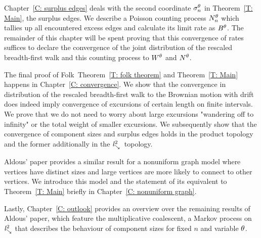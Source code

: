 Chapter~\ref{C: surplus edges} deals with the second coordinate $\mathcal{\sigma}^{\theta}_n$ in Theorem~\ref{T: Main}, the surplus edges.
We describe a Poisson counting process $N_n^{\theta}$ which tallies up all encountered excess edges and calculate its limit rate as $B^{\theta}$.
The remainder of this chapter will be spent proving that this convergence of rates suffices to declare the convergence of the joint distribution of
the rescaled breadth-first walk and this counting process to $W^{\theta}$ and $N^{\theta}$.

The final proof of Folk~Theorem~\ref{T: folk theorem} and Theorem~\ref{T: Main} happens in Chapter~\ref{C: convergence}.
We show that the convergence in distribution of the rescaled breadth-first walk to the Brownian motion with drift
does indeed imply convergence of excursions of certain length on finite intervals.
We prove that we do not need to worry about large excursions "wandering off to infinity" or the total weight of smaller excursions.
We subsequently show that the convergence of component sizes and surplus edges holds in the product topology 
and the former additionally in the $\mathit{l}^2_{\searrow}$~topology.

Aldous' paper provides a similar result for a nonuniform graph model where vertices have distinct sizes
and large vertices are more likely to connect to other vertices.
We introduce this model and the statement of its equivalent to Theorem~\ref{T: Main} briefly in Chapter~\ref{C: nonuniform graph}.

Lastly, Chapter~\ref{C: outlook} provides an overview over the remaining results of Aldous' paper,
which feature the multiplicative coalescent, a Markov process on $\mathit{l}^2_{\searrow}$ that describes the behaviour of component sizes for fixed $n$ and variable $\theta$.

